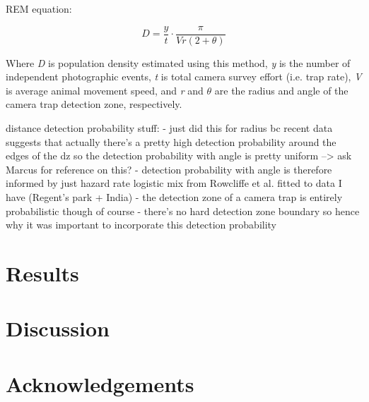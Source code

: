 \documentclass[11pt]{article}
\begin{document}
	
	REM equation:
	
		\begin{equation}
			D = \frac{y}{t} \cdot \frac{\pi}{Vr(2 + \theta)}
	\end{equation}
	
	Where \textit{D} is population density estimated using this method, \textit{y} is the number of independent photographic events, \textit{t} is total camera survey effort (i.e. trap rate), \textit{V} is average animal movement speed, and \textit{r} and \begin{math}\theta\end{math} are the radius and angle of the camera trap detection zone, respectively. 
	
	
	distance detection probability stuff:
	- just did this for radius bc recent data suggests that actually there's a pretty high detection probability around the edges of the dz so the detection probability with angle is pretty uniform --> ask Marcus for reference on this?
	- detection probability with angle is therefore informed by just hazard rate logistic mix from Rowcliffe et al. fitted to data I have (Regent's park + India)
	- the detection zone of a camera trap is entirely probabilistic though of course - there's no hard detection zone boundary so hence why it was important to incorporate this detection probability
	
	
	
	
	
	
	
	
	
	
	\section{Results}
	
	
	
	\newpage
	
	\section{Discussion}
	
	
	

	\section{Acknowledgements}

	
	
	
\end{document}
